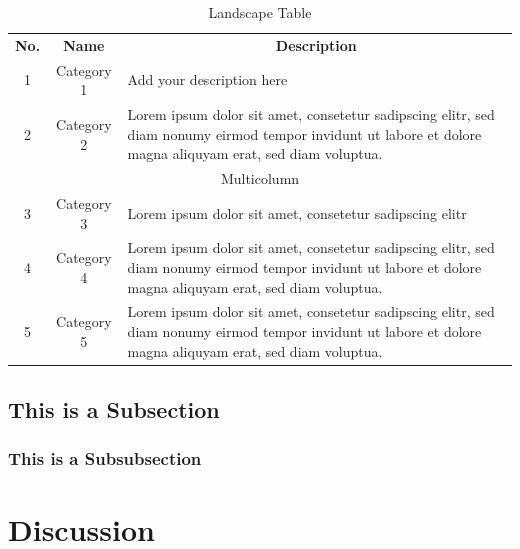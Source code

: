 \documentclass[
	12pt,
	a4paper,
	american,
	oneside
	]{scrartcl}
\begin{document}
	\begin{landscape}
		\small
		\begin{longtable}{|c|c|p{20cm}|}
			\hline
			\caption{Landscape Table}\label{tab:table1}\\
			\hline
			\multicolumn{1}{|c|}{\cellcolor{gray!40}\textbf{No.}} & \multicolumn{1}{c|}{\cellcolor{gray!40}\textbf{Name}} & \multicolumn{1}{c|}{\cellcolor{gray!40}\textbf{Description}} \\
			1  & Category 1 & Add your description here \\ \hline
			2 & Category 2 & Lorem ipsum dolor sit amet, consetetur sadipscing elitr, sed diam nonumy eirmod tempor invidunt ut labore et dolore magna aliquyam erat, sed diam voluptua. \\  \hline
			\multicolumn{3}{|c|}{\cellcolor{gray!40}Multicolumn} \\  \hline
			3 & Category 3 & Lorem ipsum dolor sit amet, consetetur sadipscing elitr \\  \hline
			4 & Category 4 & Lorem ipsum dolor sit amet, consetetur sadipscing elitr, sed diam nonumy eirmod tempor invidunt ut labore et dolore magna aliquyam erat, sed diam voluptua. \\  \hline
			5 & Category 5 & Lorem ipsum dolor sit amet, consetetur sadipscing elitr, sed diam nonumy eirmod tempor invidunt ut labore et dolore magna aliquyam erat, sed diam voluptua. \\  \hline
		\end{longtable}
	\end{landscape}

	
	\subsection{This is a Subsection}
	
	\lipsum
	
	\subsubsection{This is a Subsubsection}
	
	\lipsum
	
	\clearpage
	\FloatBarrier
	\section{Discussion}\label{sec:discussion}
	
\end{document}

